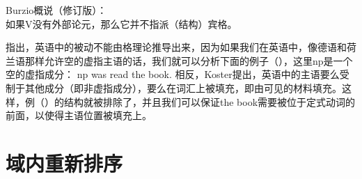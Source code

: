 
\ea
Burzio概说（修订版）：\\
如果V没有外部论元，那么它并不指派（结构）宾格。
\z

\noindent
\citet[]{Koster86a}指出，英语中的被动不能由格理论推导出来，因为如果我们在英语中，像德语和荷兰语那样允许空的虚指主语的话，我们就可以分析下面的例子（），这里np是一个空的虚指成分：
\ea
np was read the book.
\z
相反，Koster提出，英语中的主语要么受制于其他成分（即非虚指成分），要么在词汇上被填充，即由可见的材料填充。这样，例（）的结构就被排除了，并且我们可以保证the book需要被位于定式动词的前面，以使得主语位置被填充上。

\section{域内重新排序}
\label{sec-GB-lokale-Umstellung}

